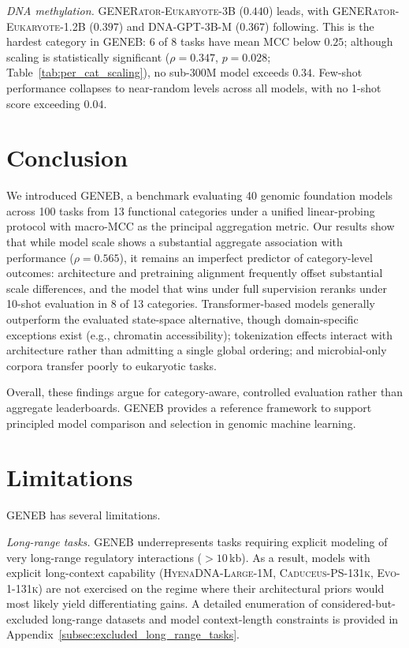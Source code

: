 \documentclass{article}
\theoremstyle{plain}
\theoremstyle{definition}
\theoremstyle{remark}
\begin{document}
\textit{DNA methylation.} \textsc{GENERator-Eukaryote-3B} ($0.440$)
leads, with \textsc{GENERator-Eukaryote-1.2B} ($0.397$) and
\textsc{DNA-GPT-3B-M} ($0.367$) following. This is the hardest
category in GENEB: $6$ of $8$ tasks have mean MCC below $0.25$;
although scaling is statistically significant
($\rho = 0.347$, $p = 0.028$; Table~\ref{tab:per_cat_scaling}),
no sub-300M model exceeds $0.34$. Few-shot performance collapses
to near-random levels across all models, with no 1-shot score
exceeding $0.04$.

\section{Conclusion}

We introduced GENEB, a benchmark evaluating 40 genomic foundation
models across 100 tasks from 13 functional categories under a
unified linear-probing protocol with macro-MCC as the principal
aggregation metric. Our results show that while model scale shows a substantial
aggregate association with performance ($\rho = 0.565$), it remains
an imperfect predictor of category-level outcomes: architecture and
pretraining alignment frequently offset substantial scale
differences, and the model that wins under full supervision reranks
under 10-shot evaluation in 8 of 13 categories. Transformer-based models generally outperform
the evaluated state-space alternative, though domain-specific
exceptions exist (e.g., chromatin accessibility); tokenization
effects interact with architecture rather than admitting a single
global ordering; and microbial-only corpora transfer poorly to
eukaryotic tasks.

Overall, these findings argue for category-aware, controlled
evaluation rather than aggregate leaderboards. GENEB provides a
reference framework to support principled model comparison and
selection in genomic machine learning.

\section{Limitations}

GENEB has several limitations.

\textit{Long-range tasks.} GENEB underrepresents tasks requiring
explicit modeling of very long-range regulatory interactions
($>10$\,kb). As a result, models with explicit long-context capability
(\textsc{HyenaDNA-Large-1M}, \textsc{Caduceus-PS-131k},
\textsc{Evo-1-131k}) are not exercised on the regime where their
architectural priors would most likely yield differentiating gains.
A detailed enumeration of considered-but-excluded long-range datasets
and model context-length constraints is provided in
Appendix~\ref{subsec:excluded_long_range_tasks}.
\end{document}
